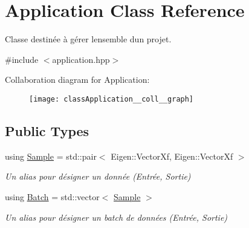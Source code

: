 \hypertarget{classApplication}{}\section{Application Class Reference}
\label{classApplication}


Classe destinée à gérer l\textquotesingle{}ensemble d\textquotesingle{}un projet.  




{\ttfamily \#include $<$application.\+hpp$>$}



Collaboration diagram for Application\+:\nopagebreak
\begin{figure}[H]
\begin{center}
\leavevmode
\texttt{[image: classApplication\_\_coll\_\_graph]}
\end{center}
\end{figure}
\subsection*{Public Types}
\begin{DoxyCompactItemize}
\item 
using \hyperlink{classApplication_add64c430fa6318ac4885ea5ddedf0780}{Sample} = std\+::pair$<$ Eigen\+::\+Vector\+Xf, Eigen\+::\+Vector\+Xf $>$
\begin{DoxyCompactList}\small\item\em Un alias pour désigner un donnée (Entrée, Sortie) \end{DoxyCompactList}\item 
using \hyperlink{classApplication_a9888f02149ca3b8ffa499ee07426cd1d}{Batch} = std\+::vector$<$ \hyperlink{classApplication_add64c430fa6318ac4885ea5ddedf0780}{Sample} $>$
\begin{DoxyCompactList}\small\item\em Un alias pour désigner un batch de données (Entrée, Sortie) \end{DoxyCompactList}\end{DoxyCompactItemize}
